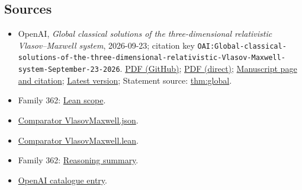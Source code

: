 \documentclass[11pt]{article}
\begin{document}
\subsection{Sources}
\begin{itemize}
\item OpenAI, \emph{Global classical solutions of the three-dimensional relativistic Vlasov–Maxwell system}, 2026-09-23; citation key \texttt{OAI:Global-classical-solutions-of-the-three-dimensional-relativistic-Vlasov-Maxwell-system-September-23-2026}. \href{https://github.com/openai/math/blob/adc7f1241b42e322a6451854ab7e4b4c146bf78a/preprints/Global-classical-solutions-of-the-three-dimensional-relativistic-Vlasov-Maxwell-system-September-23-2026/paper.pdf}{PDF (GitHub)}; \href{https://github.com/openai/math/raw/adc7f1241b42e322a6451854ab7e4b4c146bf78a/preprints/Global-classical-solutions-of-the-three-dimensional-relativistic-Vlasov-Maxwell-system-September-23-2026/paper.pdf}{PDF (direct)}; \href{https://github.com/openai/math/blob/adc7f1241b42e322a6451854ab7e4b4c146bf78a/preprints/Global-classical-solutions-of-the-three-dimensional-relativistic-Vlasov-Maxwell-system-September-23-2026/README.md}{Manuscript page and citation}; \href{https://github.com/openai/math/blob/main/preprints/Global-classical-solutions-of-the-three-dimensional-relativistic-Vlasov-Maxwell-system-September-23-2026/paper.pdf}{Latest version}; Statement source: \href{https://github.com/openai/math/blob/adc7f1241b42e322a6451854ab7e4b4c146bf78a/preprints/Global-classical-solutions-of-the-three-dimensional-relativistic-Vlasov-Maxwell-system-September-23-2026/build/sections/introduction.tex\#L42}{thm:global}.
\item Family 362: \href{https://github.com/openai/math/blob/adc7f1241b42e322a6451854ab7e4b4c146bf78a/lean/docs/362.md}{Lean scope}.
\item \href{https://github.com/openai/math/blob/adc7f1241b42e322a6451854ab7e4b4c146bf78a/lean/ComparatorChallenges/VlasovMaxwell.json}{Comparator VlasovMaxwell.json}.
\item \href{https://github.com/openai/math/blob/adc7f1241b42e322a6451854ab7e4b4c146bf78a/lean/ComparatorChallenges/VlasovMaxwell.lean}{Comparator VlasovMaxwell.lean}.
\item Family 362: \href{https://github.com/openai/math/blob/adc7f1241b42e322a6451854ab7e4b4c146bf78a/reasoning\_traces/relativistic-vlasov-maxwell.pdf}{Reasoning summary}.
\item \href{https://github.com/openai/math/blob/adc7f1241b42e322a6451854ab7e4b4c146bf78a/CONTENTS.md}{OpenAI catalogue entry}.
\end{itemize}
\end{document}
